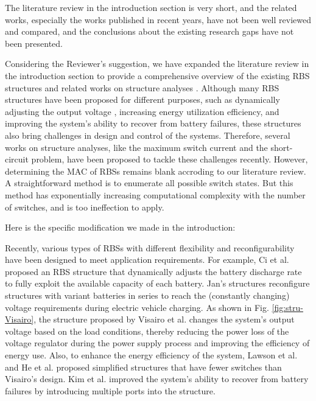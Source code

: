 \begin{revcomment}
  The literature review in the introduction section is very short, and the related works, especially the works published in recent years, have not been well reviewed and compared, and the conclusions about the existing research gaps have not been presented.
\end{revcomment}
\begin{revresponse}

Considering the Reviewer's suggestion, we have expanded the literature review in the introduction section to provide a comprehensive overview of the existing RBS structures \cite{ci2007novel,9209774,engelhardt2021double,visairoReconfigurableBatteryPack2008,lawsonSoftwareConfigurableBattery2012,he2014reconfiguration,kim2009dynamic} and related works on structure analyses \cite{han2021analysis,chenSneakCircuitTheory2021}. 
Although many RBS structures have been proposed for different purposes, such as dynamically adjusting the output voltage , increasing energy utilization efficiency, and improving the system's ability to recover from battery failures, these structures also bring challenges in design and control of the systems.
Therefore, several works on structure analyses, like the maximum switch current and the short-circuit problem, have been proposed to tackle these challenges recently.
However, determining the MAC of RBSs remains blank accroding to our literature review.
A straightforward method is to enumerate all possible switch states.
But this method has exponentially increasing computational complexity with the number of switches, and is too ineffection to apply.


Here is the specific modification we made in the introduction:
\begin{changes}
Recently, various types of RBSs with different flexibility and reconfigurability have been designed to meet application requirements. 
For example, Ci et al. \cite{ci2007novel} proposed an RBS structure that dynamically adjusts the battery discharge rate to fully exploit the available capacity of each battery. 
Jan's \cite{9209774,engelhardt2021double} structures  reconfigure structures with variant batteries in series to reach the (constantly changing) voltage requirements during electric vehicle charging.
As shown in Fig. \ref{fig:stru-Visairo}, the structure proposed by Visairo et al. \cite{visairoReconfigurableBatteryPack2008}  changes the system's output voltage based on the load conditions, thereby reducing the power loss of the voltage regulator during the power supply process and improving the efficiency of energy use. 
Also, to enhance the energy efficiency of the system, Lawson et al. \cite{lawsonSoftwareConfigurableBattery2012} and He et al. \cite{he2014reconfiguration}  proposed simplified structures that have fewer switches than Visairo's design.
Kim et al. \cite{kim2009dynamic} improved the system's ability to recover from battery failures by introducing multiple ports into the structure. 



\end{changes}
\end{revresponse}
